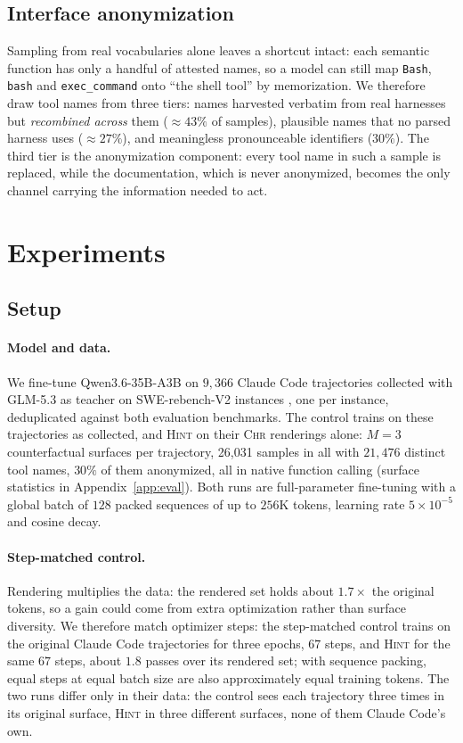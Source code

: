 \documentclass{article} %
\newcommand{\method}{\textsc{Hint}}
\newcommand{\chr}{\textsc{Chr}}
\newcommand{\basemodel}{Qwen3.6-35B-A3B}
\newcommand{\claudecode}{Claude Code}
\newcommand{\control}{step-matched control}
\newcommand{\numsurfaces}{26{,}031}       %
\begin{document}
\subsection{Interface anonymization}

Sampling from real vocabularies alone leaves a shortcut intact: each semantic
function has only a handful of attested names, so a model can still map
\texttt{Bash}, \texttt{bash} and \texttt{exec\_command} onto ``the shell tool''
by memorization. We therefore
draw tool names from three tiers: names harvested verbatim from real harnesses
but \emph{recombined across} them ($\approx43\%$ of samples), plausible names
that no parsed harness uses ($\approx27\%$), and meaningless pronounceable identifiers ($30\%$). The third tier is the
anonymization component: every tool name in such a sample is replaced, while
the documentation, which is never anonymized, becomes the only channel
carrying the information needed to act.

\section{Experiments}
\label{sec:exp}

\subsection{Setup}
\label{sec:setup}
\paragraph{Model and data.} We fine-tune \basemodel{} \citep{qwen36card} on
$9{,}366$ \claudecode{} trajectories collected with GLM-5.3 \citep{glm53card}
as teacher on SWE-rebench-V2 instances \citep{badertdinov2026swerebenchv2},
one per instance, deduplicated against both evaluation benchmarks. The
control trains on these trajectories as collected, and \method{} on their
\chr{} renderings alone: $M=3$ counterfactual surfaces per trajectory,
\numsurfaces{} samples in all with $21{,}476$ distinct tool names, $30\%$ of
them anonymized, all in native function calling (surface statistics in
Appendix~\ref{app:eval}). Both runs are full-parameter fine-tuning with a
global batch of $128$ packed sequences of up to $256$K tokens, learning rate
$5\times10^{-5}$ and cosine decay.

\paragraph{Step-matched control.} Rendering multiplies the data: the
rendered set holds about $1.7\times$ the original tokens, so a gain could come
from extra optimization rather than surface diversity. We therefore match optimizer steps: the \control{} trains on the
original \claudecode{} trajectories for three epochs, $67$ steps, and
\method{} for the same $67$ steps, about $1.8$ passes over its rendered set;
with sequence packing, equal steps at equal batch size are also
approximately equal training tokens. The two runs differ only in their data:
the control sees each trajectory three times in its original surface,
\method{} in three different surfaces, none of them \claudecode{}'s own.
\end{document}
